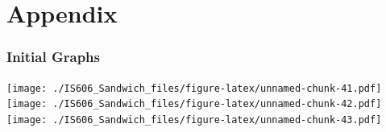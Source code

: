 \documentclass[]{article}
\begin{document}
\section{Appendix}\label{appendix}

\subsubsection{Initial Graphs}\label{initial-graphs}

\texttt{[image: ./IS606\_Sandwich\_files/figure-latex/unnamed-chunk-41.pdf]}
\texttt{[image: ./IS606\_Sandwich\_files/figure-latex/unnamed-chunk-42.pdf]}
\texttt{[image: ./IS606\_Sandwich\_files/figure-latex/unnamed-chunk-43.pdf]}
\end{document}
